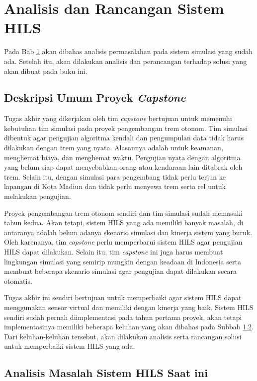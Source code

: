 \chapter{Analisis dan Rancangan Sistem HILS}\label{chapter-3}

Pada Bab \ref{chapter-3} akan dibahas analisis permasalahan pada sistem simulasi yang sudah
ada. Setelah itu, akan dilakukan analisis dan perancangan terhadap solusi yang
akan dibuat pada buku ini.

\section{Deskripsi Umum Proyek \textit{Capstone}}

Tugas akhir yang dikerjakan oleh tim \textit{capstone} bertujuan untuk memenuhi
kebutuhan tim simulasi pada proyek pengembangan trem otonom. Tim simulasi
dibentuk agar pengujian algoritma kendali dan pengumpulan data tidak harus
dilakukan dengan trem yang nyata. Alasannya adalah untuk keamanan, menghemat
biaya, dan menghemat waktu. Pengujian nyata dengan algoritma yang belum siap
dapat menyebabkan orang atau kendaraan lain ditabrak oleh trem. Selain itu,
dengan simulasi para pengembang tidak perlu terjun ke lapangan di Kota Madiun
dan tidak perlu menyewa trem serta rel untuk melakukan pengujian.

Proyek pengembangan trem otonom sendiri dan tim simulasi sudah memasuki tahun
kedua. Akan tetapi, sistem HILS yang ada memiliki banyak masalah, di antaranya
adalah belum adanya skenario simulasi dan kinerja sistem yang buruk. Oleh
karenanya, tim \textit{capstone} perlu memperbarui sistem HILS agar pengujian
HILS dapat dilakukan. Selain itu, tim \textit{capstone} ini juga harus membuat
lingkungan simulasi yang semirip mungkin dengan keadaan di Indonesia serta
membuat beberapa skenario simulasi agar pengujian dapat dilakukan secara
otomatis.

Tugas akhir ini sendiri bertujuan untuk memperbaiki agar sistem HILS dapat
menggunakan sensor virtual dan memiliki dengan kinerja yang baik.  Sistem HILS
sendiri sudah pernah diimplementasi pada tahun pertama proyek, akan tetapi
implementasinya memiliki beberapa keluhan yang akan dibahas pada Subbab
\ref{chapter-3-problems}. Dari keluhan-keluhan tersebut, akan dilakukan analisis
serta rancangan solusi untuk memperbaiki sistem HILS yang ada.

\section{Analisis Masalah Sistem HILS Saat ini}\label{chapter-3-problems}

